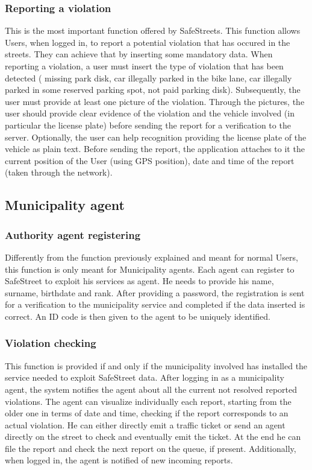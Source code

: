 \documentclass[a4paper]{report}
\begin{document}
\subsubsection{Reporting a violation}
This is the most important function offered by SafeStreets. This function allows Users, when logged in, to report a potential violation that has occured in the streets. 
They can achieve that by inserting some mandatory data. When reporting a violation, a user must insert the type of violation that has been detected ( missing park disk, car illegally parked in the bike lane, car illegally parked in some reserved parking spot, not paid parking disk).
Subsequently, the user must provide at least one picture of the violation. Through the pictures, the user should provide clear evidence of the violation and the vehicle involved (in particular the license plate) before sending the report for a verification to the server. Optionally, the user can help recognition providing the license plate of the vehicle as plain text. Before sending the report, the application attaches to it the current position of the User (using GPS position), date and time of the report (taken through the network).

\subsection{Municipality agent}
\subsubsection{Authority agent registering}
Differently from the function previously explained and meant for normal Users, this function is only meant for Municipality agents. Each agent can register to SafeStreet to exploit his services as agent. He needs to provide his name, surname, birthdate and rank. After providing a password, the registration is sent for a verification to the municipality service and completed if the data inserted is correct. An ID code is then given to the agent to be uniquely identified.

\subsubsection{Violation checking}

This function is provided if and only if the municipality involved has installed the service needed to exploit SafeStreet data. After logging in as a municipality agent, the system notifies the agent about all the current not resolved reported violations. The agent can visualize individually each report, starting from the older one in terms of date and time, checking if the report corresponds to an actual violation. He can either directly emit a traffic ticket or send an agent directly on the street to check and eventually emit the ticket. At the end he can file the report and check the next report on the queue, if present.
Additionally, when logged in, the agent is notified of new incoming reports. 
\end{document}

